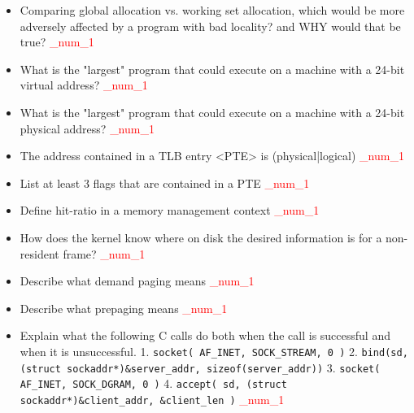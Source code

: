 \documentclass[9pt,landscape]{memoir}
\newcommand{\answer}[1]{\textcolor{red}{_num_1}}
\begin{document}
\begin{multicols}{6}
\begin{itemize}
    \item Comparing global allocation vs. working set allocation, which would be more adversely affected by a program with bad locality? and WHY would that be true?  \answer{Working set allocation would be more adversely affected by a program with bad locality. This is because the program with bad locality has poorly defined working sets and therefore, many page faults are likely to occur}
    \item What is the "largest" program that could execute on a machine with a 24-bit virtual address?  \answer{$2^{24}$ byte}
    \item What is the "largest" program that could execute on a machine with a 24-bit physical address?  \answer{Can't tell. Need to know the size of the virtual (logical) address}
    \item The address contained in a TLB entry <PTE> is (physical|logical) \answer{physical}
    \item List at least 3 flags that are contained in a PTE \answer{Valid bit, Reference bit, Dirty bit}
    \item Define hit-ratio in a memory management context \answer{in a two-level memory (cache-RAM or RAM-Harddisk), the fraction of all memory accesses that are found in the main memory (i.e. the cache)}
    \item How does the kernel know where on disk the desired information is for a non-resident frame?  \answer{If valid bit=0, Page Table Entry should contain the Disk address}
    \item Describe what demand paging means \answer{The technique of only loading virtual pages into memory as they are accessed is known as demand paging. If the demand pages are not in memory, a page fault trap happens, and the operation system swaps them in}
    \item Describe what prepaging means \answer{Prepaging brings in more consecutive pages than needed. If a virtual page X causes a pagefault, then virtual page (X+1) is also brought in along with X. It is less overhead to bring in pages that reside contiguously on the disk}
    \item Explain what the following C calls do both when the call is successful and when it is unsuccessful. 1. \texttt{socket( AF\_INET, SOCK\_STREAM, 0 )} 2. \texttt{bind(sd, (struct sockaddr*)\&server\_addr, sizeof(server\_addr))} 3. \texttt{socket( AF\_INET, SOCK\_DGRAM, 0 )} 4. \texttt{accept( sd, (struct sockaddr*)\&client\_addr, \&client\_len )} \answer{1. creates an internet stream (TCP) socket and returns the socket descriptor. If the call fails, it returns -1. 2. Binds the definition of a socket (socket descriptor) to a port number. If the call fails, it returns -1. 3. creates an internet datagram (UDP) socket and returns the socket descriptor. If the call fails, it returns -1. 4. Blocks execution until a client connection is received. When that happens, it returns a descriptor for the connection. If the call fails, it returns -1}

\end{itemize}
\end{multicols}
\end{document}
